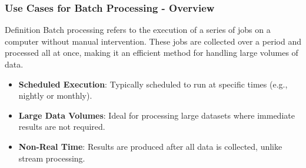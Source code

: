 \documentclass{beamer}
\begin{document}
\begin{frame}[fragile]
    \frametitle{Use Cases for Batch Processing - Overview}
    \begin{block}{Definition}
        Batch processing refers to the execution of a series of jobs on a computer without manual intervention.
        These jobs are collected over a period and processed all at once, making it an efficient method for handling large volumes of data.
    \end{block}

    \begin{itemize}
        \item \textbf{Scheduled Execution}: Typically scheduled to run at specific times (e.g., nightly or monthly).
        \item \textbf{Large Data Volumes}: Ideal for processing large datasets where immediate results are not required.
        \item \textbf{Non-Real Time}: Results are produced after all data is collected, unlike stream processing.
    \end{itemize}
\end{frame}
\end{document}
